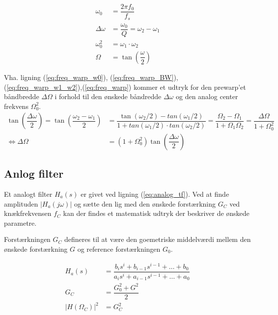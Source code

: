     \begin{align}
    \omega_0 &= \dfrac{2 \pi f_0}{f_s} \label{eq:freq_warp_w0}\\
    \Delta \omega &= \dfrac{\omega_0}{Q} = \omega_2 - \omega_1 \label{eq:freq_warp_BW} \\ 
    \omega_0^2 &= \omega_1 \cdot \omega_2 \label{eq:freq_warp_w1_w2} \\
    \Omega &= \tan\left(  \dfrac{\omega}{2} \right) \label{eq:freq_warp}
    \end{align}
        
    Vha. ligning (\ref{eq:freq_warp_w0}), (\ref{eq:freq_warp_BW}),(\ref{eq:freq_warp_w1_w2}),(\ref{eq:freq_warp}) 
    kommer et udtryk for den prewarp'et båndbredde $\Delta \Omega$ i 
    forhold til den ønskede båndredde $\Delta \omega$ og den analog center frekvens $\Omega_0^2$.
\begin{align}
    \tan \left( \dfrac{\Delta \omega}{2} \right) = \tan \left( \dfrac{\omega_2 - \omega_1}{2} \right) &= \dfrac{\tan(\omega_2/2) - tan(\omega_1/2)}{1 + tan(\omega_1/2) \cdot tan(\omega_2/2)} = \dfrac{\Omega_2 - \Omega_1}{1 + \Omega_1 \Omega_2} = \dfrac{\Delta \Omega}{1 + \Omega_0^2}\\
    \iff \Delta \Omega &= (1 + \Omega_0^2) \tan \left( \dfrac{\Delta \omega}{2} \right)
\end{align}

    \subsection{Anlog filter }

    Et analogt filter $H_a(s)$ er givet ved ligning (\ref{eq:analog_tf}). Ved at finde amplituden $|H_a (j\omega)|$ og sætte den 
    lig med den ønskede forstærkning $G_C$ ved knækfrekvensen $f_C$ kan der findes et matematisk udtryk der beskriver de ønskede parametre.
    
    Forstærkningen $G_C$ defineres til at være den goemetriske middelværdi mellem den ønskede forstærkning $G$ og reference forstærkningen $G_0$.

    \begin{align}
        H_a(s) &= \dfrac{b_i s^i + b_{i-1} s^{i-1}+ \dots + b_0 }{a_i s^i + a_{i-1} s^{i-1} +  \dots +a_0 }
        \label{eq:analog_tf} \\
        G_C &= \dfrac{G_0^2 + G^2}{2} \label{eq:analog_gc_def} \\
        |H(\Omega_C)|^2 &= G_C^2 \label{eq:analog_amp}
    \end{align}
    
